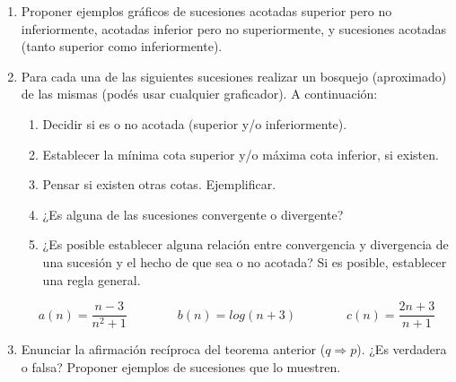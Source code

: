 \documentclass[12pt]{article}
\newtheorem*{myteo}{Teorema} %
\theoremstyle{definition}
\newtheorem*{mydef}{Definición}
\begin{document}
\begin{enumerate}
{{\begin{mydef}
\noindent
Una sucesión que es a la vez acotada superior e inferiormente, se dice \textbf{acotada}.
\end{mydef}
}}
\vspace{0.5 cm}

\item Proponer ejemplos gráficos de sucesiones acotadas superior pero no inferiormente, acotadas inferior pero no superiormente, y sucesiones acotadas (tanto superior como inferiormente).

\item Para cada una de las siguientes sucesiones realizar un bosquejo (aproximado) de las mismas (podés usar cualquier graficador). A continuación:
\begin{enumerate}
\setlength\itemsep{0em}
\item Decidir si es o no acotada (superior y/o inferiormente).
\item Establecer la mínima cota superior y/o máxima cota inferior, si existen. 
\item Pensar si existen otras cotas. Ejemplificar.
\item ¿Es alguna de las sucesiones convergente o divergente?
\item ¿Es posible establecer alguna relación entre convergencia y divergencia de una sucesión y el hecho de que sea o no acotada? Si es posible, establecer una regla general.
\end{enumerate}
\begin{equation*}
a(n) = \frac{n-3}{n^2+1} \qquad\qquad
b(n)= log(n+3)\qquad\qquad
c(n) = \frac{2n+3}{n+1}
\end{equation*}

\vspace{0.3 cm}


\vspace{0.5 cm}

\item  Enunciar la afirmación recíproca del teorema anterior ($q\Rightarrow p$). ¿Es verdadera o falsa? Proponer ejemplos de sucesiones que lo muestren.	

\vspace{0.5 cm}


\end{enumerate}
\end{document}
